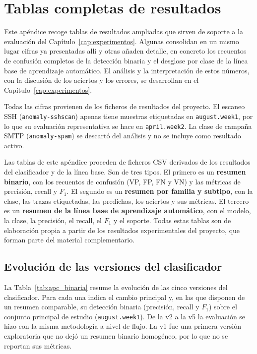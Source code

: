 \chapter{Tablas completas de resultados}
\label{ap:tablas_resultados}

Este apéndice recoge tablas de resultados ampliadas que sirven de soporte a la evaluación del Capítulo~\ref{cap:experimentos}. Algunas consolidan en un mismo lugar cifras ya presentadas allí y otras añaden detalle, en concreto los recuentos de confusión completos de la detección binaria y el desglose por clase de la línea base de aprendizaje automático. El análisis y la interpretación de estos números, con la discusión de los aciertos y los errores, se desarrollan en el Capítulo~\ref{cap:experimentos}.

Todas las cifras provienen de los ficheros de resultados del proyecto. El escaneo SSH (\texttt{anomaly-sshscan}) apenas tiene muestras etiquetadas en \texttt{august.week1}, por lo que su evaluación representativa se hace en \texttt{april.week2}. La clase de campaña SMTP (\texttt{anomaly-spam}) se descartó del análisis y no se incluye como resultado activo.

Las tablas de este apéndice proceden de ficheros CSV derivados de los resultados del clasificador y de la línea base. Son de tres tipos. El primero es un \textbf{resumen binario}, con los recuentos de confusión (VP, FP, FN y VN) y las métricas de precisión, recall y $F_1$. El segundo es un \textbf{resumen por familia y subtipo}, con la clase, las trazas etiquetadas, las predichas, los aciertos y sus métricas. El tercero es un \textbf{resumen de la línea base de aprendizaje automático}, con el modelo, la clase, la precisión, el recall, el $F_1$ y el soporte. Todas estas tablas son de elaboración propia a partir de los resultados experimentales del proyecto, que forman parte del material complementario.

\section{Evolución de las versiones del clasificador}
\label{sec:apc_binaria}

La Tabla~\ref{tab:apc_binaria} resume la evolución de las cinco versiones del clasificador. Para cada una indica el cambio principal y, en las que disponen de un resumen comparable, su detección binaria (precisión, recall y $F_1$) sobre el conjunto principal de estudio (\texttt{august.week1}). De la v2 a la v5 la evaluación se hizo con la misma metodología a nivel de flujo. La v1 fue una primera versión exploratoria que no dejó un resumen binario homogéneo, por lo que no se reportan sus métricas.

